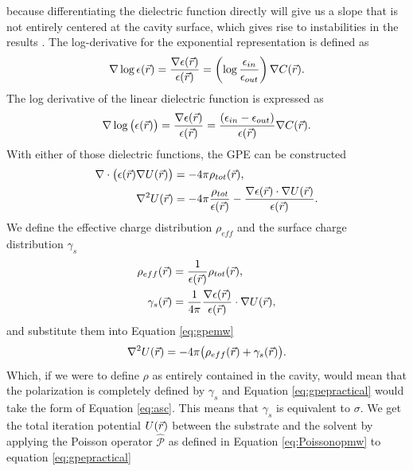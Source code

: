 \documentclass[../Thesis.tex]{subfiles}
\begin{document}
because differentiating the dielectric function directly will give us a slope that is
not entirely centered at the cavity surface, which gives rise to instabilities in
the results \cite{FossoTande:2013ka}.  The log-derivative for the exponential representation
is defined as \cite{FossoTande:2013ka}
\begin{equation}\label{eq:logderepsexp}
  \nabla\log\epsilon(\vec{r}) = \frac{\nabla\epsilon(\vec{r})}{\epsilon(\vec{r})}
   = \left(\log\frac{\epsilon_{in}}{\epsilon_{out}} \right)\nabla C(\vec{r}).
\end{equation}
The log derivative of the linear dielectric function is expressed as
\begin{equation}\label{eq:logderepslin}
  \nabla \log\big(\epsilon (\vec{r})\big) = \frac{\nabla\epsilon(\vec{r})}{\epsilon(\vec{r})}
  = \frac{(\epsilon_{in} - \epsilon_{out})}{\epsilon(\vec{r})}\nabla C(\vec{r}).
\end{equation}
With either of those dielectric functions, the \ac{GPE} can be constructed
\cite{Sorland, FossoTande:2013ka}
\begin{align}\label{eq:gpemw}
  \nabla\cdot \big(\epsilon(\vec{r})\nabla U(\vec{r})\big) &= -4\pi \rho_{tot}(\vec{r}), \\
  \nabla^2U(\vec{r}) &= -4\pi \frac{\rho_{tot}}{\epsilon(\vec{r})} - \frac{\nabla
  \epsilon(\vec{r})\cdot \nabla U(\vec{r})}{\epsilon(\vec{r})}.
\end{align}
We define the effective charge distribution $\rho_{eff}$ and the surface charge
distribution $\gamma_s$ \cite{FossoTande:2013ka}
\begin{align}\label{eq:effrhogamma}
  \rho_{eff}(\vec{r}) &= \frac{1}{\epsilon(\vec{r})}\rho_{tot}(\vec{r}), \\
  \gamma_s(\vec{r}) &= \frac{1}{4\pi}\frac{\nabla\epsilon(\vec{r})}{\epsilon(\vec{r})}\cdot\nabla U(\vec{r}),
\end{align}
and substitute them into Equation \ref{eq:gpemw}
\begin{equation}\label{eq:gpepractical}
  \nabla^2U(\vec{r}) = -4\pi\big( \rho_{eff}(\vec{r}) + \gamma_s(\vec{r})\big).
\end{equation}
Which, if we were to define $\rho$ as entirely contained in the cavity, would mean
that the polarization is completely defined by $\gamma_s$ and Equation \ref{eq:gpepractical}
would take the form of Equation \ref{eq:asc}. This means that $\gamma_s$ is equivalent to
$\sigma$.
We get the total iteration potential $U(\vec{r})$ between the substrate and the solvent by
applying the Poisson operator $\hat{\mathscr{P}}$ as defined in Equation
\ref{eq:Poissonopmw} to equation \ref{eq:gpepractical}
\end{document}
